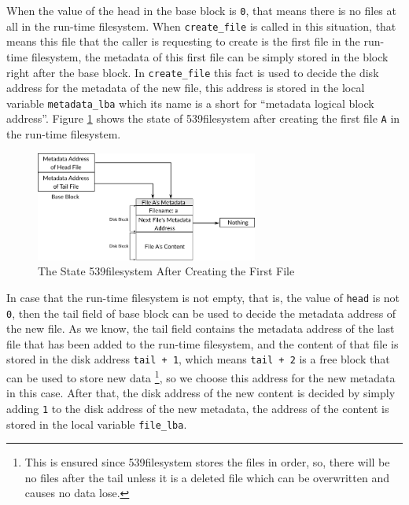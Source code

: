 When the value of the head in the base block is \lstinline!0!, that
means there is no files at all in the run-time filesystem. When
\lstinline!create_file! is called in this situation, that means this
file that the caller is requesting to create is the first file in the
run-time filesystem, the metadata of this first file can be simply
stored in the block right after the base block. In
\lstinline!create_file! this fact is used to decide the disk address for
the metadata of the new file, this address is stored in the local
variable \lstinline!metadata_lba! which its name is a short for
``metadata logical block address''. Figure
\ref{fig:create_file_empty_case} shows the state of 539filesystem after
creating the first file \lstinline!A! in the run-time filesystem.

\begin{figure}
\centering
\includegraphics[width=0.65000\textwidth]{Figures/filesystem-ch/create_file_empty_case.png}
\caption{The State 539filesystem After Creating the First
File}\label{fig:create_file_empty_case}
\end{figure}

In case that the run-time filesystem is not empty, that is, the value of
\lstinline!head! is not \lstinline!0!, then the tail field of base block
can be used to decide the metadata address of the new file. As we know,
the tail field contains the metadata address of the last file that has
been added to the run-time filesystem, and the content of that file is
stored in the disk address \lstinline!tail + 1!, which means
\lstinline!tail + 2! is a free block that can be used to store new data
\footnote{This is ensured since 539filesystem stores the files in order,
  so, there will be no files after the tail unless it is a deleted file
  which can be overwritten and causes no data lose.}, so we choose this
address for the new metadata in this case. After that, the disk address
of the new content is decided by simply adding \lstinline!1! to the disk
address of the new metadata, the address of the content is stored in the
local variable \lstinline!file_lba!.

